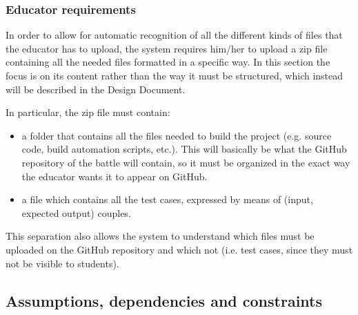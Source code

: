 \subsubsection{Educator requirements}
In order to allow for automatic recognition of all the different kinds of files that the educator has to upload, the system requires him/her to upload a zip file containing all the needed files formatted in a specific way. In this section the focus is on its content rather than the way it must be structured, which instead will be described in the Design Document. 

In particular, the zip file must contain:
\begin{itemize}
    \item a folder that contains all the files needed to build the project (e.g. source code, build automation scripts, etc.). This will basically be what the GitHub repository of the battle will contain, so it must be organized in the exact way the educator wants it to appear on GitHub.
    \item a file which contains all the test cases, expressed by means of (input, expected output) couples.
\end{itemize}
This separation also allows the system to understand which files must be uploaded on the GitHub repository and which not (i.e. test cases, since they must not be visible to students).

\subsection{Assumptions, dependencies and constraints}
